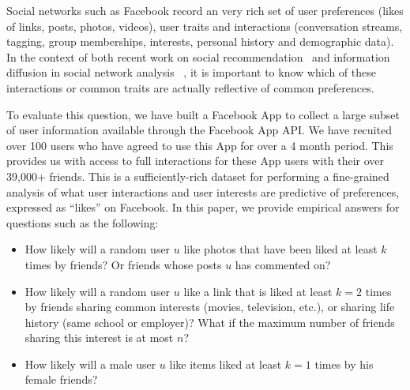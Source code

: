 
\label{sec:introduction}
Social networks such as Facebook record an very rich set of user
preferences  (likes of links, posts, photos, videos), user traits
and interactions (conversation streams, tagging, group memberships,
interests, personal history and demographic data).  In the context of
both recent work on social recommendation~\cite{sorec,ste,lla} and
information diffusion in social network analysis
~\cite{lerman2010information,Romero2011hashtag,Bakshy2012chamber}, 
it is important to know which of these interactions or common traits
are actually reflective of common preferences.

\cite{Panigrahy2012ubr}
\cite{Goel2012structure}

To evaluate this question, we have built a Facebook App to collect a
large subset of user information available through the Facebook App
API. We have recuited over 100 users who have agreed to use this App for over a 4
month period.  This provides us with access to full interactions
for these App users with their over 39,000+ friends. This is a sufficiently-rich dataset
for  performing a fine-grained analysis of what user interactions
and user interests are predictive of preferences, 
expressed as ``likes'' on Facebook. In this paper,
we provide empirical answers for questions such as the following:
\begin{itemize}
\item How likely will a random user $u$ like
photos that have been liked at least $k$ times by friends? 
Or friends whose posts $u$ has commented on?
\item How likely will a random user $u$ like a
link that is liked at least $k=2$ times by friends sharing common interests
(movies, television, etc.), or sharing life history (same school or employer)? 
What if the maximum number of friends sharing this interest is at most $n$?
\item How likely will a male user $u$ like
items liked at least $k=1$ times by his female friends?
\end{itemize}

